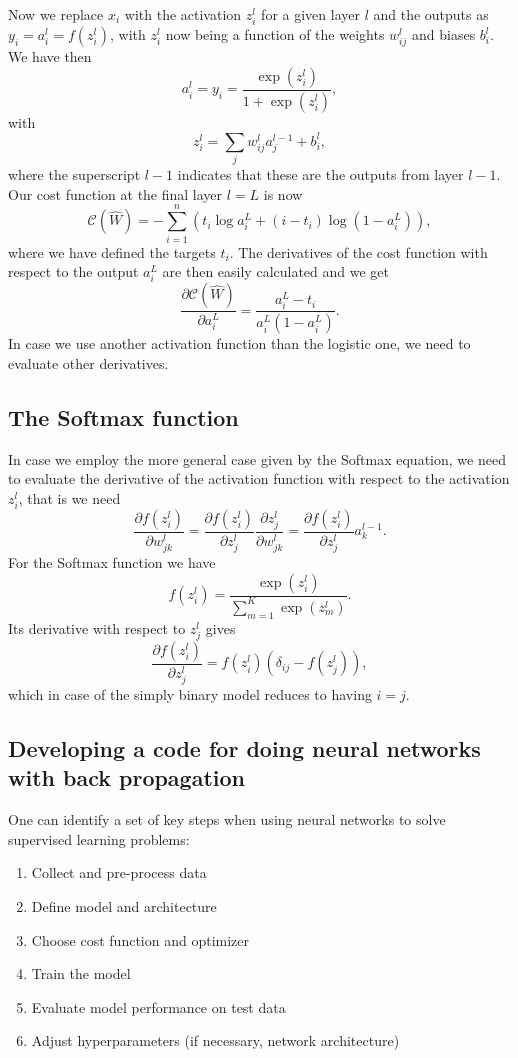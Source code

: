 \documentclass[%
oneside,                 %
final,                   %
10pt]{article}
\begin{document}
Now we replace $x_i$ with the activation $z_i^l$ for a given layer $l$ and the outputs as $y_i=a_i^l=f(z_i^l)$, with $z_i^l$ now being a function of the weights $w_{ij}^l$ and biases $b_i^l$. 
We have then
\[
a_i^l = y_i = \frac{\exp{(z_i^l)}}{1+\exp{(z_i^l)}},
\]
with 
\[
z_i^l = \sum_{j}w_{ij}^l a_j^{l-1}+b_i^l,
\]
where the superscript $l-1$ indicates that these are the outputs from layer $l-1$.
Our cost function at the final layer $l=L$ is now
\[
\mathcal{C}(\hat{W}) = - \sum_{i=1}^n \left(t_i\log{a_i^L}+(i-t_i)\log{(1-a_i^L)}\right),
\]
where we have defined the targets $t_i$. The derivatives of the cost function with respect to the output $a_i^L$ are then easily calculated and we get
\[
\frac{\partial \mathcal{C}(\hat{W})}{\partial a_i^L} = \frac{a_i^L-t_i}{a_i^L(1-a_i^L)}. 
\]
In case we use another activation function than the logistic one, we need to evaluate other derivatives. 


\subsection*{The Softmax function}
In case we employ the more general case given by the Softmax equation, we need to evaluate the derivative of the activation function with respect to the activation $z_i^l$, that is we need
\[
\frac{\partial f(z_i^l)}{\partial w_{jk}^l} =
\frac{\partial f(z_i^l)}{\partial z_j^l} \frac{\partial z_j^l}{\partial w_{jk}^l}= \frac{\partial f(z_i^l)}{\partial z_j^l}a_k^{l-1}.
\]
For the Softmax function we have
\[
f(z_i^l) = \frac{\exp{(z_i^l)}}{\sum_{m=1}^K\exp{(z_m^l)}}.
\]
Its derivative with respect to $z_j^l$ gives 
\[
\frac{\partial f(z_i^l)}{\partial z_j^l}= f(z_i^l)\left(\delta_{ij}-f(z_j^l)\right), 
\]
which in case of the simply binary model reduces to  having $i=j$. 

\subsection*{Developing a code for doing neural networks with back propagation}


One can identify a set of key steps when using neural networks to solve supervised learning problems:  

\begin{enumerate}
\item Collect and pre-process data  

\item Define model and architecture  

\item Choose cost function and optimizer  

\item Train the model  

\item Evaluate model performance on test data  

\item Adjust hyperparameters (if necessary, network architecture)
\end{enumerate}
\end{document}
